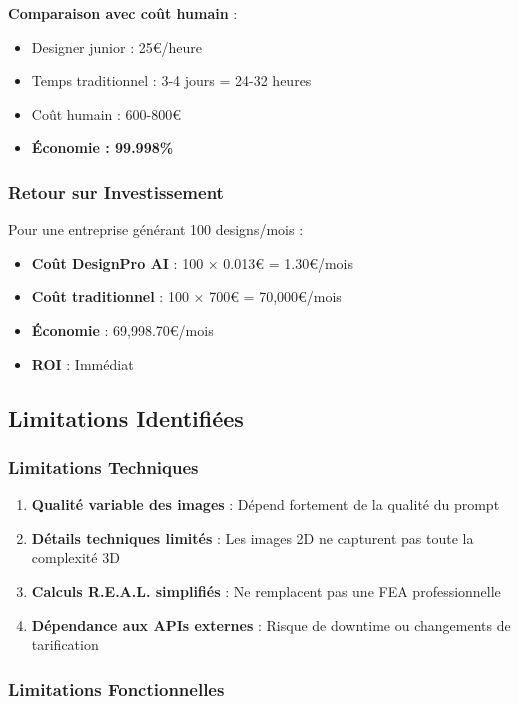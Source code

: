 \textbf{Comparaison avec coût humain} :
\begin{itemize}[leftmargin=*]
    \item Designer junior : 25€/heure
    \item Temps traditionnel : 3-4 jours = 24-32 heures
    \item Coût humain : 600-800€
    \item \textbf{Économie : 99.998\%}
\end{itemize}

\subsubsection{Retour sur Investissement}

Pour une entreprise générant 100 designs/mois :

\begin{itemize}[leftmargin=*]
    \item \textbf{Coût DesignPro AI} : 100 × 0.013€ = 1.30€/mois
    \item \textbf{Coût traditionnel} : 100 × 700€ = 70,000€/mois
    \item \textbf{Économie} : 69,998.70€/mois
    \item \textbf{ROI} : Immédiat
\end{itemize}

\subsection{Limitations Identifiées}

\subsubsection{Limitations Techniques}

\begin{enumerate}[leftmargin=*]
    \item \textbf{Qualité variable des images} : Dépend fortement de la qualité du prompt
    \item \textbf{Détails techniques limités} : Les images 2D ne capturent pas toute la complexité 3D
    \item \textbf{Calculs R.E.A.L. simplifiés} : Ne remplacent pas une FEA professionnelle
    \item \textbf{Dépendance aux APIs externes} : Risque de downtime ou changements de tarification
\end{enumerate}

\subsubsection{Limitations Fonctionnelles}

